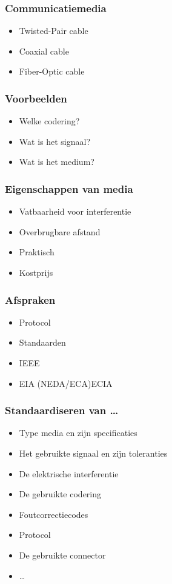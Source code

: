 \documentclass{article}
\begin{document}
\subsubsection{Communicatiemedia}
\begin{itemize}
    \item Twisted-Pair cable
    \item Coaxial cable
    \item Fiber-Optic cable
\end{itemize}

\subsubsection{Voorbeelden}
\begin{itemize}
    \item Welke codering?
    \item Wat is het signaal?
    \item Wat is het medium?
\end{itemize}

\subsubsection{Eigenschappen van media}
\begin{itemize}
    \item Vatbaarheid voor interferentie
    \item Overbrugbare afstand
    \item Praktisch
    \item Kostprijs
\end{itemize}

\subsubsection{Afspraken}
\begin{itemize}
    \item Protocol
    \item Standaarden
    \item IEEE
    \item EIA (NEDA/ECA)ECIA
\end{itemize}

\subsubsection{Standaardiseren van \dots}
\begin{itemize}
    \item Type media en zijn specificaties
    \item Het gebruikte signaal en zijn toleranties
    \item De elektrische interferentie
    \item De gebruikte codering
    \item Foutcorrectiecodes
    \item Protocol
    \item De gebruikte connector
    \item \dots
\end{itemize}
\end{document}
